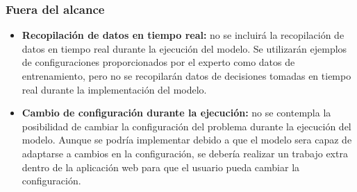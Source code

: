 \subsubsection{Fuera del alcance}
\begin{itemize}
    \item \textbf{Recopilación de datos en tiempo real:} no se incluirá la recopilación de datos en tiempo 
    real durante la ejecución del modelo. Se utilizarán ejemplos de configuraciones proporcionados 
    por el experto como datos de entrenamiento, pero no se recopilarán datos de decisiones tomadas 
    en tiempo real durante la implementación del modelo.
    \item \textbf{Cambio de configuración durante la ejecución:} no se contempla la posibilidad de cambiar
    la configuración del problema durante la ejecución del modelo. Aunque se podría implementar debido
    a que el modelo sera capaz de adaptarse a cambios en la configuración, se debería realizar un 
    trabajo extra dentro de la aplicación web para que el usuario pueda cambiar la configuración.
\end{itemize}

\pagebreak
